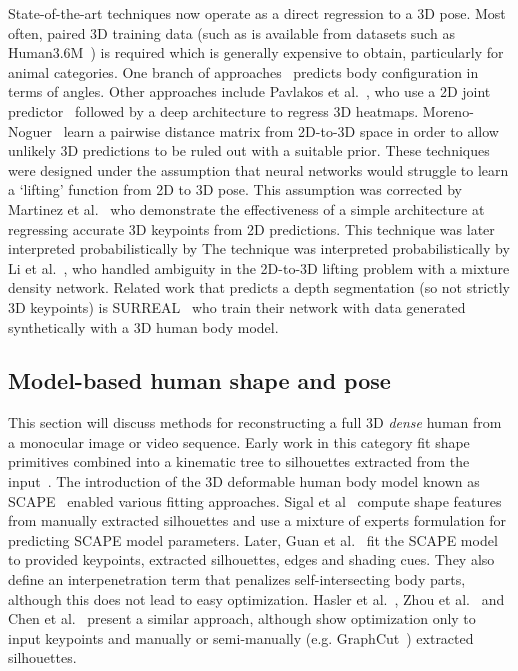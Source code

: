     State-of-the-art techniques now operate as a direct regression to a 3D pose. Most often, paired 3D training data (such as is available from datasets such as Human3.6M~\cite{xxx}) is required which is generally expensive to obtain, particularly for animal categories. One branch of approaches~\cite{tekin2016direct} predicts body configuration in terms of angles. Other approaches include Pavlakos et al.~\cite{xxx}, who use a 2D joint predictor~\cite{xxx} followed by a deep architecture to regress 3D heatmaps. Moreno-Noguer~\cite{xxx} learn a pairwise distance matrix from 2D-to-3D space in order to allow unlikely 3D predictions to be ruled out with a suitable prior. These techniques were designed under the assumption that neural networks would struggle to learn a `lifting' function from 2D to 3D pose. This assumption was corrected by Martinez et al.~\cite{xxx} who demonstrate the effectiveness of a simple architecture at regressing accurate 3D keypoints from 2D predictions. This technique was later interpreted probabilistically by The technique was interpreted probabilistically by Li et al.~\cite{xxx}, who handled ambiguity in the 2D-to-3D lifting problem with a mixture density network. Related work that predicts a depth segmentation (so not strictly 3D keypoints) is SURREAL~\cite{xxx} who train their network with data generated synthetically with a 3D human body model.




\subsection{Model-based human shape and pose}


    This section will discuss methods for reconstructing a full 3D \emph{dense} human from a monocular image or video sequence. Early work in this category fit shape primitives combined into a kinematic tree to silhouettes extracted from the input~\cite{xxx, xxx, xxx}. The introduction of the 3D deformable human body model known as SCAPE~\cite{xxx} enabled various fitting approaches. Sigal et al~\cite{xxx} compute shape features from manually extracted silhouettes and use a mixture of experts formulation for predicting SCAPE model parameters. Later, Guan et al.~\cite{xxx} fit the SCAPE model to provided keypoints, extracted silhouettes, edges and shading cues. They also define an interpenetration term that penalizes self-intersecting body parts, although this does not lead to easy optimization. Hasler et al.~\cite{xxx}, Zhou et al.~\cite{xxx} and Chen et al.~\cite{xxx} present a similar approach, although show optimization only to input keypoints and manually or semi-manually (e.g. GraphCut~\cite{xxx}) extracted silhouettes.

